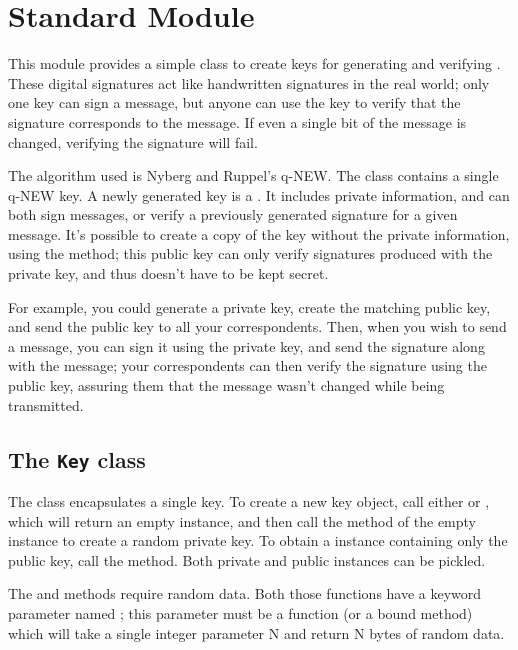 \section{Standard Module }
\label{module-digisign}

This module provides a simple class to create keys for generating and
verifying .  These digital signatures act like
handwritten signatures in the real world; only one key can sign a
message, but anyone can use the key to verify that the signature
corresponds to the message.  If even a single bit of the message is
changed, verifying the signature will fail.

The algorithm used is Nyberg and Ruppel's q-NEW.  The  class
contains a single q-NEW key.  A newly generated key is a .  It includes private information, and can both sign messages, or
verify a previously generated signature for a given message.  It's
possible to create a copy of the key without the private information,
using the  method; this public key can only verify
signatures produced with the private key, and thus doesn't have to be
kept secret.

For example, you could generate a private key, create the matching
public key, and send the public key to all your correspondents.  Then,
when you wish to send a message, you can sign it using the private
key, and send the signature along with the message; your
correspondents can then verify the signature using the public key,
assuring them that the message wasn't changed while being transmitted.


\renewcommand{\indexsubitem}{(in module digisign)}

\subsection{The {\tt Key} class}

The  class encapsulates a single key.  To create a new key
object, call either  or ,
which will return an empty  instance, and then call the
 method of the empty instance to create a random 
private key.  To obtain a  instance containing only the
public key, call the  method.  Both private and public
 instances can be pickled.

The  and  methods require random data.  Both
those functions have a keyword parameter named ; this
parameter must be a function (or a bound method) which will take a
single integer parameter N and return N bytes of random data.

